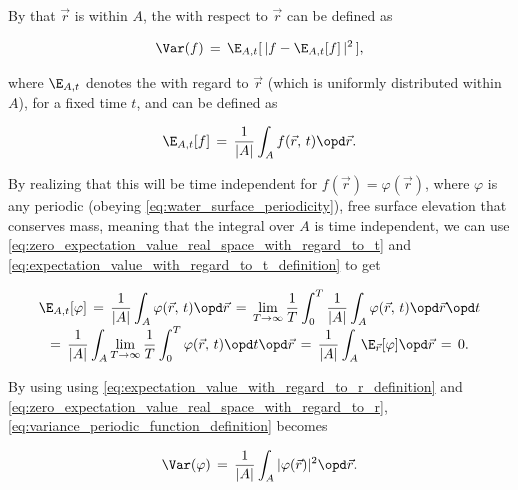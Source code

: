 \comment
{
By \assuming that $\vec{r}$ is  within $A$, the  with respect to $\vec{r}$ can be defined as

\begin{equation} \label{eq:variance_periodic_function_definition}
\Var(f) \,=\, \E_{A,t}[\,|f - \E_{A,t}[f]\,|^2\,],
\end{equation}

where $\E_{A,t}$ denotes the  with regard to  $\vec{r}$ (which is uniformly distributed within $A$), for a fixed time $t$, and can be defined as

\begin{equation} \label{eq:expectation_value_with_regard_to_r_definition}
\E_{A,t}[f] \,=\, \frac{1}{|A|}\int_A f(\vec{r},\,t)\opd\vec{r}.
\end{equation}

By realizing that this  will be time independent for $f(\vec{r}) = \varphi(\vec{r})$, where $\varphi$ is any periodic (obeying \eqref{eq:water_surface_periodicity}), free surface elevation that conserves mass, meaning that the integral over $A$ is time independent, we can use \eqref{eq:zero_expectation_value_real_space_with_regard_to_t} and \eqref{eq:expectation_value_with_regard_to_t_definition} to get

\begin{equation} \label{eq:zero_expectation_value_real_space_with_regard_to_r}
\renewcommand*{\arraystretch}{2}
\begin{array}{c}
\displaystyle \E_{A,t}[\varphi] \,=\, \frac{1}{|A|}\int_A \varphi(\vec{r},\,t)\opd\vec{r} \,=\, \lim_{T\to\infty}\frac{1}{T}\int_0^T\frac{1}{|A|}\int_A \varphi(\vec{r},\,t)\opd\vec{r}\opd t \\
\displaystyle =\, \frac{1}{|A|}\int_A\lim_{T\to\infty}\frac{1}{T}\int_0^T \varphi(\vec{r},\,t)\opd t\opd\vec{r} \,=\, \frac{1}{|A|}\int_A \E_{\vec{r}}[\varphi]\opd\vec{r} \,=\, 0.
\end{array}
\end{equation}

By using using \eqref{eq:expectation_value_with_regard_to_r_definition} and \eqref{eq:zero_expectation_value_real_space_with_regard_to_r}, \eqref{eq:variance_periodic_function_definition} becomes

\begin{equation} \label{eq:variance_integral}
\Var(\varphi) \,=\, \frac{1}{|A|}\int_A|\varphi(\vec{r})|^2\opd\vec{r}.
\end{equation}
}

